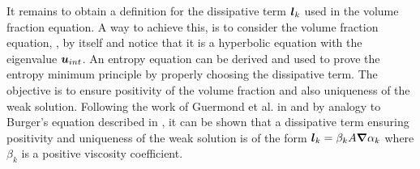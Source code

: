It remains to obtain a definition for the
dissipative term $\boldsymbol l_k$ used in the volume fraction equation. A way to achieve this, is to
consider the volume fraction equation, , by itself and notice that it is a hyperbolic equation
with the eigenvalue $\boldsymbol u_{int}$. An entropy equation can be derived and used to prove the
entropy minimum principle by properly choosing the dissipative term. The objective is to
ensure positivity of the volume fraction and also uniqueness of the weak solution. Following
the work of Guermond et al. in \cite{jlg1, jlg2} and by analogy
to Burger's equation described in , it can be shown that a dissipative term ensuring positivity and
uniqueness of the weak solution is of the form $\boldsymbol l_k = \beta_k A \boldsymbol{\nabla} \alpha_k $ where $\beta_k$
is a positive viscosity coefficient.


